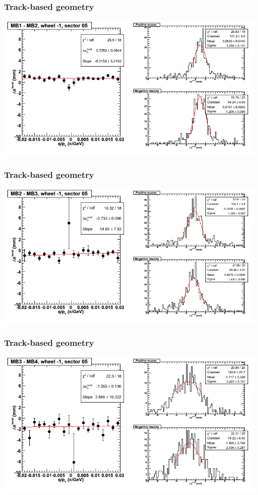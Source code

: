 \documentclass[compress]{beamer}
\begin{document}
\begin{frame}
\frametitle{Track-based geometry}
\includegraphics[width=\linewidth]{NOV4_segdiffs/dt13_resid_B_05_12.png}
\end{frame}

\begin{frame}
\frametitle{Track-based geometry}
\includegraphics[width=\linewidth]{NOV4_segdiffs/dt13_resid_B_05_23.png}
\end{frame}

\begin{frame}
\frametitle{Track-based geometry}
\includegraphics[width=\linewidth]{NOV4_segdiffs/dt13_resid_B_05_34.png}
\end{frame}
\end{document}
